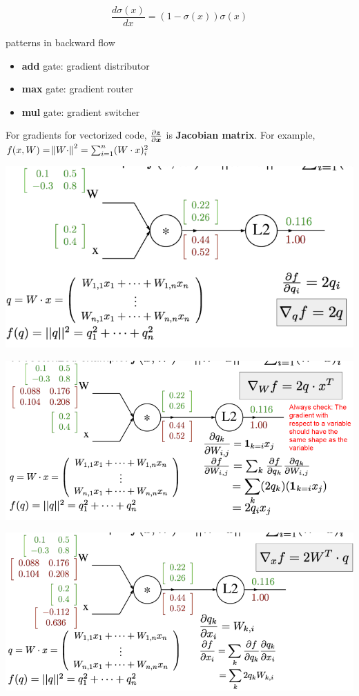\documentclass[11pt]{article}
\begin{document}
\begin{equation*}
\frac{d\sigma(x)}{dx}=(1-\sigma(x))\sigma(x)
\end{equation*}


patterns in backward flow
\begin{itemize}
\item \textbf{add} gate: gradient distributor
\item \textbf{max} gate: gradient router
\item \textbf{mul} gate: gradient switcher
\end{itemize}


For gradients for vectorized code, \(\frac{\partial \boldsymbol{z}}{\partial\boldsymbol{x}}\) is
\textbf{Jacobian matrix}. For example, \(f(x,W)=\norm{W\cdot}^2=\sum_{i=1}^n(W\cdot
    x)^2_i\)

\begin{center}
\includegraphics[width=.9\textwidth]{Backpro1}
\end{center}
\begin{center}
\includegraphics[width=.9\textwidth]{Backpro2}
\end{center}
\begin{center}
\includegraphics[width=.9\textwidth]{Backpro3}
\end{center}
\end{document}
